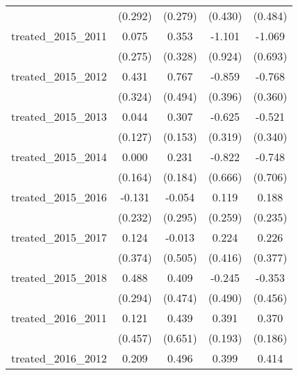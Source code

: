 {\begin{tabular}{l*{4}{c}}
            &     (0.292)         &     (0.279)         &     (0.430)         &     (0.484)         \\
[1em]
treated\_2015\_2011&       0.075         &       0.353         &      -1.101         &      -1.069         \\
            &     (0.275)         &     (0.328)         &     (0.924)         &     (0.693)         \\
[1em]
treated\_2015\_2012&       0.431         &       0.767         &      -0.859\sym{*}  &      -0.768\sym{*}  \\
            &     (0.324)         &     (0.494)         &     (0.396)         &     (0.360)         \\
[1em]
treated\_2015\_2013&       0.044         &       0.307\sym{*}  &      -0.625         &      -0.521         \\
            &     (0.127)         &     (0.153)         &     (0.319)         &     (0.340)         \\
[1em]
treated\_2015\_2014&       0.000         &       0.231         &      -0.822         &      -0.748         \\
            &     (0.164)         &     (0.184)         &     (0.666)         &     (0.706)         \\
[1em]
treated\_2015\_2016&      -0.131         &      -0.054         &       0.119         &       0.188         \\
            &     (0.232)         &     (0.295)         &     (0.259)         &     (0.235)         \\
[1em]
treated\_2015\_2017&       0.124         &      -0.013         &       0.224         &       0.226         \\
            &     (0.374)         &     (0.505)         &     (0.416)         &     (0.377)         \\
[1em]
treated\_2015\_2018&       0.488         &       0.409         &      -0.245         &      -0.353         \\
            &     (0.294)         &     (0.474)         &     (0.490)         &     (0.456)         \\
[1em]
treated\_2016\_2011&       0.121         &       0.439         &       0.391\sym{*}  &       0.370\sym{*}  \\
            &     (0.457)         &     (0.651)         &     (0.193)         &     (0.186)         \\
[1em]
treated\_2016\_2012&       0.209         &       0.496         &       0.399\sym{**} &       0.414\sym{**} \\

\end{tabular}}
